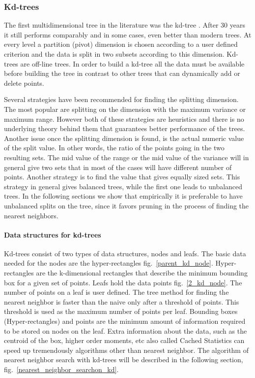 \documentclass[12pt,letterpaper,doublespaced,ETD,dvips,proposal]{gtthesis}
\begin{document}
\begin{Body}
\subsubsection{Kd-trees}
\label{Kd_trees}

The first multidimensional tree in the literature was the kd-tree \cite{bentley1975bst}. After
30 years it still performs comparably and in some cases, even
better than modern trees. At every level a partition (pivot)
dimension is chosen according to a user defined criterion and the
data is split in two subsets according to this dimension. Kd-trees
are off-line trees. In order to build a kd-tree all the data must be
available before building the tree in contrast to other trees that
can dynamically add or delete points.

Several strategies have been recommended for finding the splitting
dimension. The most popular are splitting on the dimension with the
maximum variance or maximum range. However both of these strategies are heuristics and
there is no underlying theory behind them that guarantees better
performance of the trees. Another issue once the splitting dimension
is found, is the actual numeric value of the split value. In other words,
the ratio of the points going in the two resulting sets. The mid
value of the range or the mid value of the variance will in general
give two sets that in most of the cases will have different number
of points. Another strategy is to find the value that gives equally
sized sets. This strategy in general gives balanced trees, while the
first one leads to unbalanced trees. In the following sections we
show that empirically it is preferable to have unbalanced splits
on the tree, since it favors pruning in the process of finding the
nearest neighbors.

\paragraph{Data structures for kd-trees}

 Kd-trees consist of two types of data structures, nodes and
 leafs. The basic data needed for the nodes are the
 hyper-rectangles fig.~\ref{parent_kd_node}. Hyper-rectangles are the k-dimensional rectangles that describe the minimum bounding box  for a given set of points.
 Leafs hold the data points  fig.~\ref{2_kd_node}. The number of points on a
 leaf is user defined. The tree method for finding the nearest neighbor is faster than the naive
 only after a threshold of points. This threshold is used as the maximum number of points
 per leaf. Bounding boxes (Hyper-rectangles) and points are the minimum amount
 of information required to be stored on nodes on the leaf. Extra
 information about the data, such as the centroid of the box, higher
 order moments, etc also called Cached Statistics can speed up
 tremendously algorithms other than nearest neighbor. The algorithm
 of nearest neighbor search with kd-trees will be described  in the following section,
 fig.~\ref{nearest_neighbor_searchon_kd}.


\end{Body}
\end{document}

